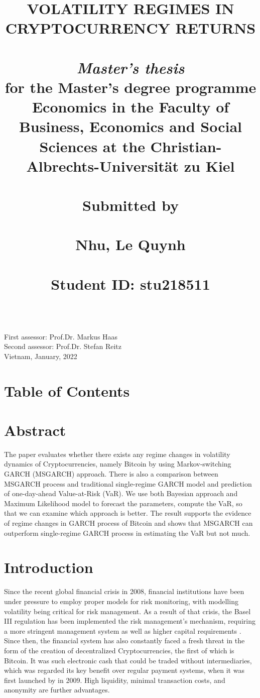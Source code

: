 \documentclass[12pt,a4paper]{article}
\title{\textbf{VOLATILITY REGIMES IN CRYPTOCURRENCY RETURNS } \\~\\
\large \textit{Master's thesis} \\
\large for the Master's degree programme Economics in the Faculty of Business, Economics and Social Sciences at the Christian-Albrechts-Universität zu Kiel \\~\\
\large Submitted by \\~\\
\large Nhu, Le Quynh \\~\\ 
\large Student ID: stu218511}
\date{}
\begin{document}

\begin{titlepage}
\maketitle
\mbox{} \\[1in]
First assessor: Prof.Dr. Markus Haas \\
Second assessor: Prof.Dr. Stefan Reitz \\
Vietnam, January, 2022
	
\end{titlepage}

\section*{Table of Contents}
\tableofcontents
\newpage

\thispagestyle{empty}
\listoffigures
\newpage
\listoftables
\newpage

\section{Abstract}
The paper evaluates whether there exists any regime changes in volatility dynamics of Cryptocurrencies, namely Bitcoin by using Markov-switching GARCH (MSGARCH) approach. There is also a comparison between MSGARCH process and traditional single-regime GARCH model and prediction of one-day-ahead Value-at-Risk (VaR). We use both Bayesian approach and Maximum Likelihood model to forecast the parameters, compute the VaR, so that we can examine which approach is better. The result supports the evidence of regime changes in GARCH process of Bitcoin and shows that MSGARCH can outperform single-regime GARCH process in estimating the VaR but not much. \par
 
\section{Introduction}
Since the recent global financial crisis in 2008, financial institutions have been under pressure to employ proper models for risk monitoring, with modelling volatility being critical for risk management. As a result of that crisis, the Basel III regulation has been implemented the risk management's mechanism, requiring a more stringent management system as well as higher capital requirements \citep{basel1996supervision}. Since then, the financial system has also constantly faced a fresh threat in the form of the creation of decentralized Cryptocurrencies, the first of which is Bitcoin. It was such electronic cash that could be traded without intermediaries, which was regarded its key benefit over regular payment systems, when it was first launched by \cite{nakamoto2008bitcoin} in 2009. High liquidity, minimal transaction costs, and anonymity are further advantages.  \par
\end{document}
